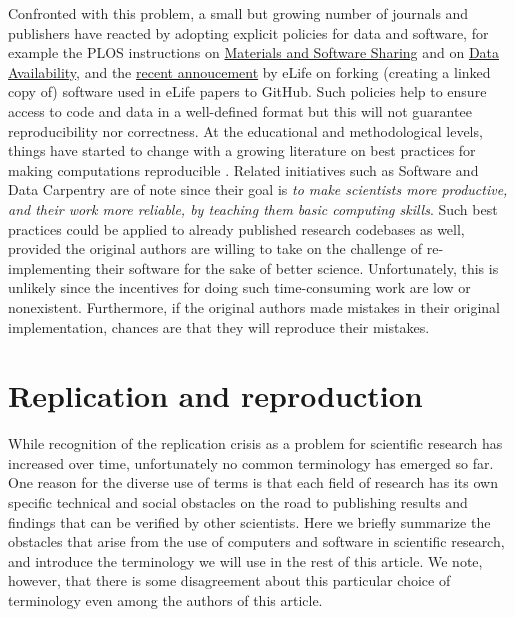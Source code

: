 \documentclass[a4paper,10pt, twocolumn]{article}
\begin{document}
Confronted with this problem, a small but growing number of journals and
publishers have reacted by adopting explicit policies for data and software, for example the PLOS instructions on
\href{http://journals.plos.org/plosone/s/materials-and-software-sharing}{Materials
  and Software Sharing} and
on \href{http://journals.plos.org/plosone/s/data-availability}{Data Availability},
and the
\href{https://elifesciences.org/elife-news/inside-elife-forking-software-used-elife-papers-github}{recent
  annoucement} by eLife on forking (creating a linked copy of) software used in eLife papers to GitHub.
Such policies help to ensure access to code and data in a well-defined format
\citep{perkel:2016} but this will not guarantee reproducibility nor
correctness.
At the educational and methodological levels, things have started to change with a
growing literature on best practices for making computations reproducible
\citep{sandve:2013, crook:2013, wilson:2014, halchenko:2015, janz:2015,
  hinsen:2015}.
  Related initiatives such as Software and Data Carpentry
\citep{wilson:2016} are of note since their goal is {\em to make
scientists more productive, and their work more reliable, by teaching them basic computing skills}.
Such best practices could be applied to already published research codebases as well, provided the original authors are willing to take on the challenge of 
re-implementing their software for the sake of better science.
Unfortunately, this is unlikely since the
incentives for doing such time-consuming work are low or nonexistent.
Furthermore, if the original authors made mistakes in their original
implementation, chances are that they will reproduce their mistakes.\\


\section*{Replication and reproduction}
\label{sec:replication-reproduction}
While recognition of the replication crisis as a problem
for scientific research has increased over time, unfortunately no 
common terminology has emerged so far. One reason for
the diverse use of terms is that each field of research has its own
specific technical and social obstacles on the road to publishing
results and findings that can be verified by other scientists. Here we
briefly summarize the obstacles that arise from the use of computers
and software in scientific research, and introduce the terminology we
will use in the rest of this article. We note, however, that there is
some disagreement about this particular choice of terminology even
among the authors of this article. \\
\end{document}

